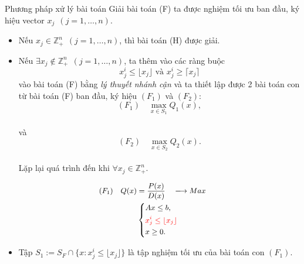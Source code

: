 \documentclass{beamer}
\begin{document}
\begin{frame}{Phương pháp xử lý bài toán}
Giải bài toán (F) ta được nghiệm tối ưu ban đầu, ký hiệu vector $x_j \:\: (j=1,\ldots,n)$.
\begin{itemize}
\item Nếu $x_j \in \mathbb{Z}^n_+ \:\: (j=1,\ldots,n)$, thì bài toán (H) được giải.
\item Nếu $\exists x_j \notin \mathbb{Z}^n_+ \:\: (j=1,\ldots,n)$, ta thêm vào các ràng buộc 
\begin{equation*}
    x^i_j \leq \lfloor x_j \rfloor \text{ và } x^i_j \geq \lceil x_j \rceil 
\end{equation*}
vào bài toán (F) bằng \textsl{lý thuyết nhánh cận} và ta thiết lập được 2 bài toán con từ bài toán (F) ban đầu, ký hiệu $(F_1)$ và $(F_2)$:
\begin{equation*}
(F_1) \quad \underset{x \in S_1}{\max}Q_1(x),
\end{equation*} \\
và
\begin{equation*}
(F_2) \quad \underset{x \in S_2}{\max}Q_2(x).
\end{equation*} \\    
Lặp lại quá trình đến khi $\forall x_j \in \mathbb{Z}^n_+$.
\end{itemize}
\end{frame}
\begin{frame}
\begin{equation} \small \label{F}
    \begin{split}
    (F_1) \quad Q(x) & = \frac{P(x)}{D(x)} \quad \longrightarrow Max \\
        & \left\{
        \begin{split}
        &Ax \leq  b, \\
        &\color{red} x^i_j \leq \lfloor x_j \rfloor \\
        &x \geq 0. \\
        \end{split}
        \right.    
    \end{split}
\end{equation}
\begin{itemize}
    \item Tập $S_1:=S_F \cap \{ x: x^i_j \leq \lfloor x_j \rfloor \}$ là tập nghiệm tối ưu của bài toán con $(F_1)$.
    \end{itemize}               
\end{frame}
\end{document}
